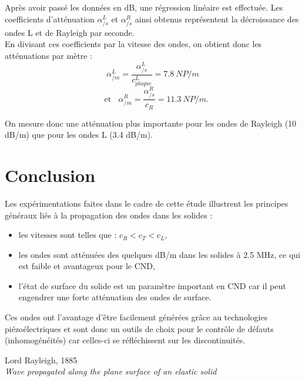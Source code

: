 \documentclass[twoside]{article}
\begin{document}
\begin{multicols}{2}
Après avoir passé les données en dB, une régression linéaire est effectuée. Les coefficients d'atténuation $\alpha_{/s}^{L}$ et $\alpha_{/s}^{R}$ ainsi obtenus représentent la décroissance des ondes L et de Rayleigh par seconde. \\
En divisant ces coefficients par la vitesse des ondes, on obtient donc les atténuations par mètre : 
$$\alpha_{/m}^{L}=\frac{\alpha_{/s}^L}{c_{plaque}^L}=7.8 ~NP/m$$ $$~~~~\text{et}~~~~\alpha_{/m}^{R}=\frac{\alpha_{/s}^R}{c_{R}}=11.3~NP/m.$$

On mesure donc une atténuation plus importante pour les ondes de Rayleigh (10 dB/m) que pour les ondes L (3.4 dB/m).

\section{Conclusion}

Les expérimentations faites dans le cadre de cette étude illustrent les principes généraux liés à la propagation des ondes dans les solides : 
\begin{itemize}
	\item les vitesses sont telles que : $c_{R}<c_{T}<c_{L}$,
	\item les ondes sont atténuées des quelques dB/m dans les solides à 2.5 MHz, ce qui est faible et avantageux pour le CND,
	\item l'état de surface du solide est un paramètre important en CND car il peut engendrer une forte atténuation des ondes de surface.	
\end{itemize}
Ces ondes ont l'avantage d'être facilement générées grâce au technologies piézoélectriques et sont donc un outils de choix pour le contrôle de défauts (inhomogénéités) car celles-ci se réfléchissent sur les discontinuités.

\begin{thebibliography}{99} %
Lord Rayleigh, 1885 \\
\newblock \emph{ Wave propagated along the plane surface of an elastic solid}
\end{thebibliography}

\end{multicols}
\end{document}
